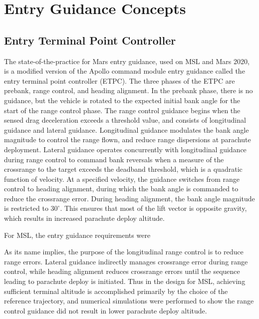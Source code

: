 \chapter{Entry Guidance Concepts}

\section{Entry Terminal Point Controller}
The state-of-the-practice for Mars entry guidance, used on MSL and Mars 2020, is a modified version of the Apollo command module entry guidance \cite{MSL_EDL2} called the entry terminal point controller (ETPC). 
The three phases of the ETPC are prebank, range control, and heading alignment. In the prebank phase, there is no guidance, but the vehicle is rotated to the expected initial bank angle for the start of the range control phase.
The range control guidance begins when the sensed drag deceleration exceeds a threshold value, and consists of longitudinal guidance and lateral guidance. Longitudinal guidance modulates the bank angle magnitude to control the range flown, and reduce range dispersions at parachute deployment. Lateral guidance operates concurrently with longitudinal guidance during range control to command bank reversals when a measure of the crossrange to the target exceeds the deadband threshold, which is a quadratic function of velocity. At a specified velocity, the guidance switches from range control to heading alignment, during which the bank angle is commanded to reduce the crossrange error. During heading alignment, the bank angle magnitude is restricted to $30^{\circ}$. This ensures that most of the lift vector is opposite gravity, which results in increased parachute deploy altitude.

For MSL, the entry guidance requirements were 

As its name implies, the purpose of the longitudinal range control is to reduce range errors. Lateral guidance indirectly manages crossrange error during range control, while heading alignment reduces crossrange errors until the sequence leading to parachute deploy is initiated. Thus in the design for MSL, achieving sufficient terminal altitude is accomplished primarily by the choice of the reference trajectory, and numerical simulations were performed to show the range control guidance did not result in lower parachute deploy altitude. 

